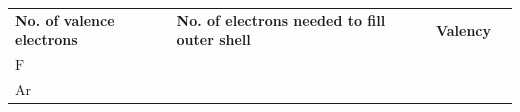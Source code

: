 \begin{enumerate}[noitemsep, label=\textbf{\arabic*}. ]
{{\begin{center}
\begin{tabular}[t]{|l|l|l|l|}
        \textbf{No. of valence electrons} &
    
    
        \textbf{No. of electrons needed to fill outer shell} &
    
    
        \textbf{Valency}%
     \tabularnewline\cline{1-1}\cline{2-2}\cline{3-3}\cline{4-4}
    
    
        \begin{math}\mathrm{F}\end{math} &
    
    
         &
    
    
         &
    
    
     \tabularnewline\cline{1-1}\cline{2-2}\cline{3-3}\cline{4-4}
    
    
        \begin{math}\mathrm{Ar}\end{math} &
    

\end{tabular}
\end{center}}}
\end{enumerate}
